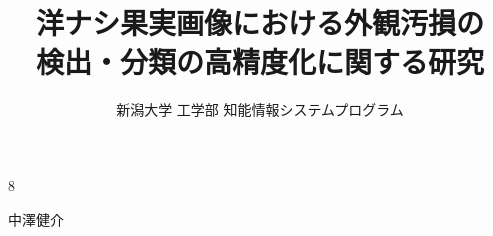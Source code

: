 



\begin{toppage}
  \title{洋ナシ果実画像における外観汚損の\\検出・分類の高精度化に関する研究}{8}


  \author{新潟大学 工学部 知能情報システムプログラム }{中澤健介}
\end{toppage}



\contents



% 





